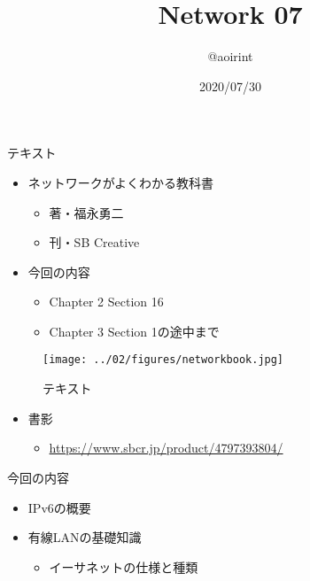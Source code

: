 \documentclass[12pt,aspectratio=169]{beamer}
\title{Network 07}
\author{@aoirint}
\date{2020/07/30}
\begin{document}
\frame{\maketitle}

\begin{frame}{テキスト}

  \begin{minipage}{0.58\textwidth}
    \begin{itemize}
      \item ネットワークがよくわかる教科書
      \begin{itemize}
        \item 著・福永勇二
        \item 刊・SB Creative
      \end{itemize}
      \item 今回の内容
        \begin{itemize}
          \item Chapter 2 Section 16
          \item Chapter 3 Section 1の途中まで
        \end{itemize}

    \end{itemize}

  \end{minipage}
  \hfill
  \begin{minipage}{0.38\textwidth}
    \vspace{-1\baselineskip}
    \begin{figure}[h]
      \centering
      \texttt{[image: ../02/figures/networkbook.jpg]}
      \label{fig:networkbook}
      \caption{テキスト}
    \end{figure}
  \end{minipage}

  \begin{itemize}
    \item 書影
    \begin{itemize}
      \item { \small \url{https://www.sbcr.jp/product/4797393804/} }
    \end{itemize}
  \end{itemize}

\end{frame}


\begin{frame}{今回の内容}

  \begin{itemize}
    \item IPv6の概要
    \item 有線LANの基礎知識
      \begin{itemize}
        \item イーサネットの仕様と種類
      \end{itemize}

  \end{itemize}

\end{frame}
\end{document}
